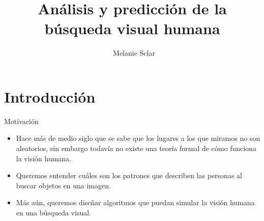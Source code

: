 \documentclass[compress]{beamer}
\title[Defensa de tesis de licenciatura] %
{Análisis y predicción de la búsqueda visual humana}
\author[Melanie Sclar] %
{~Melanie Sclar}
\institute[UBA] %
{
  Facultad de Ciencias Exactas y Naturales\\
  Universidad de Buenos Aires
}
\begin{document}
\begin{frame}
  \titlepage
\end{frame}


\section{Introducción}
\begin{frame}{Motivación}
\begin{itemize}
\item Hace más de medio siglo que se sabe que los lugares a los que miramos no son aleatorios, sin embargo todavía no existe una teoría formal de cómo funciona la visión humana.
\item Queremos entender cuáles son los patrones que describen las personas al buscar objetos en una imagen.
\item Más aún, queremos diseñar algoritmos que puedan simular la visión humana en una búsqueda visual.
\end{itemize}
\end{frame}
\end{document}
